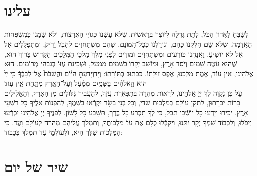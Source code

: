 \documentclass[twoside, openany, parskip=half, 11pt]{book}
\begin{document}
 \uvaletzion
 
  \pageref{musaphrh}\\
 \pageref{musaphregel}\\


\label{end of shacharis}
\fullkaddish

\section*{ עלינו }

\newcommand{\aleinu}{
\firstword{עָלֵֽינוּ}
 לְשַׁבֵּחַ לַאֲדוֹן הַכֹּל, לָתֵת גְּדֻלָּה לְיוֹצֵר בְּרֵאשִׁית, שֶׁלֹּא עָשָׂנוּ כְּגוֹיֵי הָאֲרָצוֹת, וְלֹא שָׂמָנוּ כְּמִשְׁפְּֿחוֹת הָאֲדָמָה. שֶׁלֹּא שָׂם חֶלְקֵנוּ כָּהֶם, וגוֹרָלֵנוּ כְּכָל־הֲמוֹנָם, שֶׁהֵם מִשְׁתַּחֲוִים לְהֶבֶל וָרִיק, וּמִתְפַּלֲּלִים אֶל אֵל לֹא יוֹשִׁיעַ. וַאֲנַחְנוּ כּוֹרְֿעִים וּמִשְׁתַּחֲוִים וּמוֹדִים לִפְנֵי מֶלֶךְ מַלְכֵי הַמְּֿלָכִים הַקָּדוֹשׁ בָּרוּךְ הוּא, שֶׁהוּא נוֹטֶה שָׁמַיִם וְיֹסֵד אָרֶץ, וּמוֹשַׁב יְקָרוֹ בַּשָּׁמַיִם מִמַּעַל, וּשְׁכִינַת עֻזּוֹ בְּגָבְהֵי מְרוֹמִים. הוּא אֱלֹהֵינוּ, אֵין עוֹד, אֱמֶת מַלְכֵּנוּ, אֶפֶס זוּלָתוֹ. כַּכָּתוּב בְּתּוֹרָתוֹ: וְיָדַוְיָדַעְתָּ֣
 \source{דברים ד}
  הַיּ֗וֹם וַהֲשֵׁבֹתָ֮ אֶל־לְבָבֶ֒ךָ֒ כִּ֤י יְיָ֙ ה֣וּא הָֽאֱלֹהִ֔ים בַּשָּׁמַ֣יִם מִמַּ֔עַל וְעַל־הָאָ֖רֶץ מִתָּ֑חַת אֵ֖ין עֽוֹד׃\\
עַל כֵּן נְקַוֶּה לְךָ יְיָ אֱלֹהֵינוּ, לִרְאוֹת מְהֵרָה בְּתִפְאֶרֶת עֻזֶּךָ, לְהַעֲבִיר גִּלּוּלִים מִן הָאָרֶץ, וְהָאֱלִילִים כָּרוֹת יִכָּרֵתוּן, לְתַקֵּן עוֹלָם בְּמַלְכוּת שַׁדַּי, וְכָל בְּנֵי בָשָׂר יִקְרְֿאוּ בִשְׁמֶךָ, לְהַפְנוֹת אֵלֶיךָ כָּל רִשְׁעֵי אָרֶץ. יַכִּירוּ וְיֵדְעוּ כָּל יוֹשְֿׁבֵי תֵבֵל, כִּי לְךָ תִכְרַע כָּל בֶּרֶךְ, תִּשָּׁבַע כָּל לָשׁוֹן. לְפָנֶיךָ יְיָ אֱלֹהֵינוּ יִכְרְֿעוּ וְיִפֹּלוּ, וְלִכְבוֹד שִׁמְךָ יְקָר יִתֵּנוּ, \adforn{14} וִיקַבְּֿלוּ כֻלָּם אֶת עֹל מַלְכוּתֶךָ, וְתִמְלֹךְ עֲלֵיהֶם מְהֵרָה לְעוֹלָם וָעֶד. כִּי הַמַּלְכוּת שֶׁלְּֿךָ הִיא, וּלְעוֹלְֿמֵי עַד תִּמְלֹךְ בְּכָבוֹד:
}

\aleinu



\section[שיר של יום]{ שיר של יום }
\label{shir_shel_yom}
\end{document}
